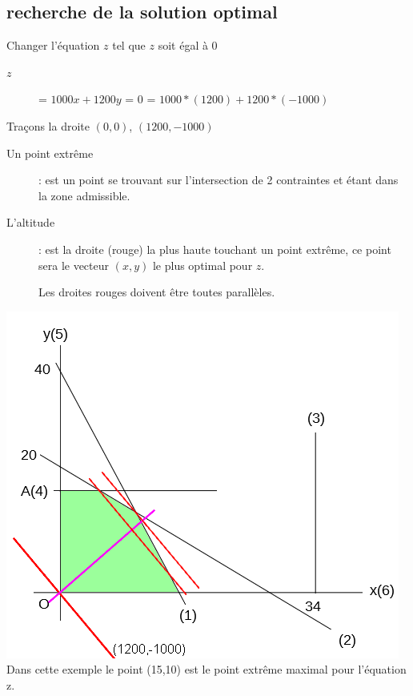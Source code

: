 \subsection{recherche de la solution optimal}

Changer l'équation $z$ tel que $z$ soit égal à $0$
\begin{description}
\item[$z$] = $1000x + 1200y$ = $0$ = $1000*(1200) + 1200 *(-1000)$
\end{description}
Traçons la droite $(0,0)$, $(1200,-1000)$
\begin{description}
\item[Un point extrême]: est un point se trouvant sur l'intersection de 2 contraintes et étant dans la zone admissible.
\item[L'altitude]: est la droite (rouge) la plus haute touchant un point extrême, ce point sera le vecteur $(x,y)$ le plus optimal pour $z$.
\item[] Les droites rouges doivent être toutes parallèles.
\end{description}
\includegraphics[scale=0.55]{img/ro-pl-2var_1.png} \\
Dans cette exemple le point (15,10) est le point extrême maximal pour l'équation z.\\
\pagebreak

